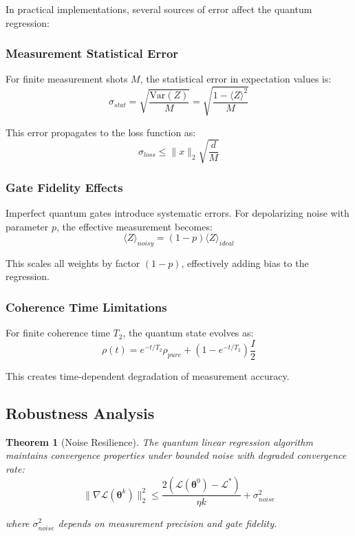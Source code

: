 \documentclass[11pt]{article}
\newtheorem{theorem}{Theorem}[section]
\begin{document}
In practical implementations, several sources of error affect the quantum regression:

\subsubsection{Measurement Statistical Error}

For finite measurement shots $M$, the statistical error in expectation values is:
\begin{equation}
\sigma_{stat} = \sqrt{\frac{\text{Var}(Z)}{M}} = \sqrt{\frac{1 - \langle Z \rangle^2}{M}}
\end{equation}

This error propagates to the loss function as:
\begin{equation}
\sigma_{loss} \leq \|x\|_2 \sqrt{\frac{d}{M}}
\end{equation}

\subsubsection{Gate Fidelity Effects}

Imperfect quantum gates introduce systematic errors. For depolarizing noise with parameter $p$, the effective measurement becomes:
\begin{equation}
\langle Z \rangle_{noisy} = (1-p) \langle Z \rangle_{ideal}
\end{equation}

This scales all weights by factor $(1-p)$, effectively adding bias to the regression.

\subsubsection{Coherence Time Limitations}

For finite coherence time $T_2$, the quantum state evolves as:
\begin{equation}
\rho(t) = e^{-t/T_2} \rho_{pure} + (1-e^{-t/T_2}) \frac{I}{2}
\end{equation}

This creates time-dependent degradation of measurement accuracy.

\subsection{Robustness Analysis}

\begin{theorem}[Noise Resilience]
The quantum linear regression algorithm maintains convergence properties under bounded noise with degraded convergence rate:
\begin{equation}
\|\nabla \mathcal{L}(\bm{\theta}^k)\|_2^2 \leq \frac{2(\mathcal{L}(\bm{\theta}^0) - \mathcal{L}^*)}{\eta k} + \sigma_{noise}^2
\end{equation}

where $\sigma_{noise}^2$ depends on measurement precision and gate fidelity.
\end{theorem}
\end{document}
